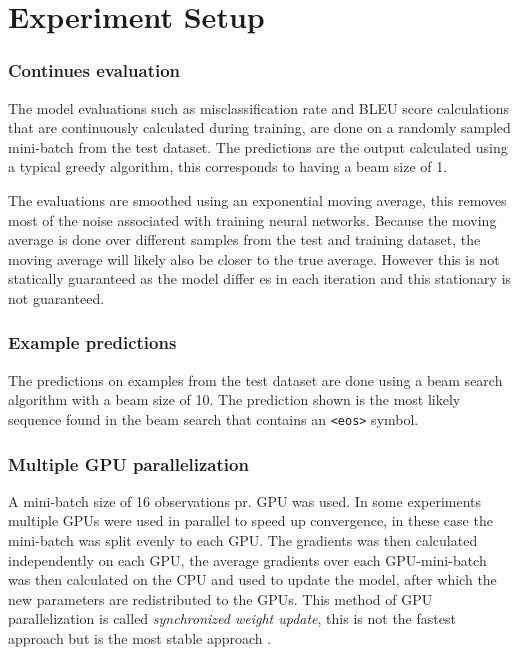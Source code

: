 
\section{Experiment Setup}

\subsubsection{Continues evaluation}
The model evaluations such as misclassification rate and BLEU score calculations that are continuously calculated during training, are done on a randomly sampled mini-batch from the test dataset. The predictions are the output calculated using a typical greedy algorithm, this corresponds to having a beam size of 1.

The evaluations are smoothed using an exponential moving average, this removes most of the noise associated with training neural networks. Because the moving average is done over different samples from the test and training dataset, the moving average will likely also be closer to the true average. However this is not statically guaranteed as the model differ es in each iteration and this stationary is not guaranteed.

\subsubsection{Example predictions}
The predictions on examples from the test dataset are done using a beam search algorithm with a beam size of 10. The prediction shown is the most likely sequence found in the beam search that contains an \texttt{<eos>} symbol.

\subsubsection{Multiple GPU parallelization}
A mini-batch size of 16 observations pr. GPU was used. In some experiments multiple GPUs were used in parallel to speed up convergence, in these case the mini-batch was split evenly to each GPU. The gradients was then calculated independently on each GPU, the average gradients over each GPU-mini-batch was then calculated on the CPU and used to update the model, after which the new parameters are redistributed to the GPUs. This method of GPU parallelization is called \textit{synchronized weight update}, this is not the fastest approach but is the most stable approach \cite{citation-needed}.
